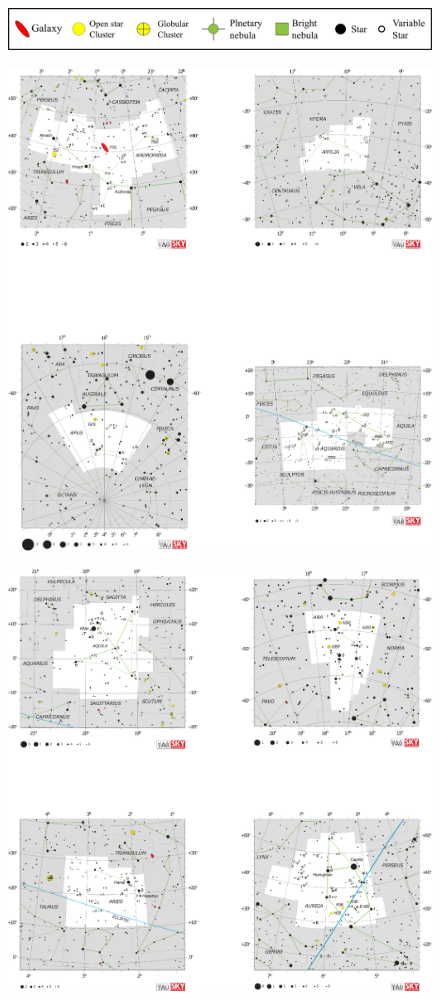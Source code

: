 \documentclass[a4paper,12pt]{extarticle}
\begin{document}
\vfill{
\begin{figure}[H]
    \centering
    \includegraphics[width=0.8\linewidth]{legend.png}
\end{figure}}
\clearpage
\begin{figure}
    \centering
    \includegraphics[width=\linewidth]{C1.eps}
\end{figure}
\clearpage
\begin{figure}
    \centering
    \includegraphics[width=\linewidth]{C2.eps}
\end{figure}
\end{document}
